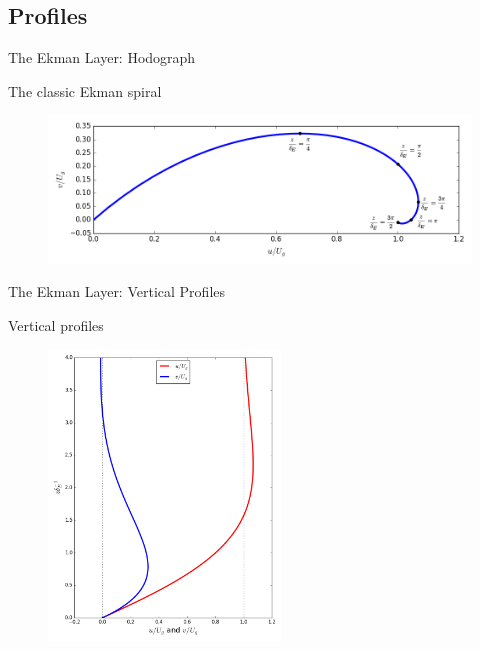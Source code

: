 \subsection{Profiles}
\begin{frame}{The Ekman Layer: Hodograph}

The classic Ekman spiral
	\begin{figure}
		\includegraphics[width=\textwidth]{ekman2.png}	
	\end{figure}
\end{frame}
\begin{frame}{The Ekman Layer: Vertical Profiles}

Vertical profiles
	\begin{figure}
		\includegraphics[width=0.55\textwidth]{ekman3.png}	
	\end{figure}
\end{frame}
